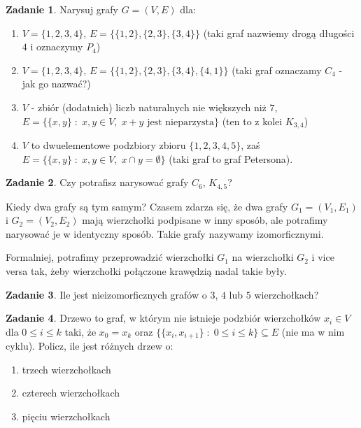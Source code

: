 \documentclass{uoom}
\theoremstyle{definition}
\newtheorem{zadd}{Zadanie}
\newenvironment{zadanie}{
  \begin{zadd}
  }
  {
    \end{zadd}\vspace{\ooodstep}
  }
\begin{document}
\begin{zadanie}
  Narysuj grafy $G=(V, E)$ dla:
  \begin{enumerate}
    \item $V=\{1,2,3,4\}$, $E=\{\{1,2\}, \{2,3\}, \{3, 4\} \}$ (taki graf nazwiemy drogą długości $4$ i oznaczymy $P_4$)
    \item $V=\{1,2,3,4\}$, $E=\{\{1,2\},\{2,3\},\{3,4\},\{4,1\}\}$ (taki graf oznaczamy $C_4$ - jak go nazwać?)
    \item $V$ - zbiór (dodatnich) liczb naturalnych nie większych niż $7$, $E = \{\{x, y\}\;:\;x, y \in V,\; x + y \text{ jest nieparzysta}\}$ (ten to z kolei $K_{3,4}$)
    \item $V$ to dwuelementowe podzbiory zbioru $\{1,2,3,4,5\}$, zaś $E=\{\{x,y\}\;:\;x,y\in V,\;x\cap y=\emptyset\}$ (taki graf to graf Petersona).
  \end{enumerate}
\end{zadanie}

\begin{zadanie}
  Czy potrafisz narysować grafy $C_6$, $K_{4,5}$?
\end{zadanie}

\begin{mybox}{Kiedy dwa grafy są tym samym?}
  Czasem zdarza się, że dwa grafy $G_1=(V_1,E_1)$ i $G_2=(V_2, E_2)$ mają wierzchołki podpisane w inny sposób, ale potrafimy narysować je w identyczny sposób. Takie grafy nazywamy izomorficznymi.

  Formalniej, potrafimy przeprowadzić wierzchołki $G_1$ na wierzchołki $G_2$ i vice versa tak, żeby wierzchołki połączone krawędzią nadal takie były.
\end{mybox}

\begin{zadanie}
  Ile jest nieizomorficznych grafów o $3$, $4$ lub $5$ wierzchołkach?
\end{zadanie}

\begin{zadanie}
  Drzewo to graf, w którym nie istnieje podzbiór wierzchołków $x_i\in V$ dla $0\leq i\leq k$ taki, że $x_0=x_k$ oraz $\{\{x_i, x_{i+1}\}\;:\;0\leq i\leq k\}\subseteq E$ (nie ma w nim cyklu). Policz, ile jest różnych drzew o:
  \begin{enumerate}
    \item trzech wierzchołkach
    \item czterech wierzchołkach
    \item pięciu wierzchołkach
  \end{enumerate}
\end{zadanie}
\end{document}
